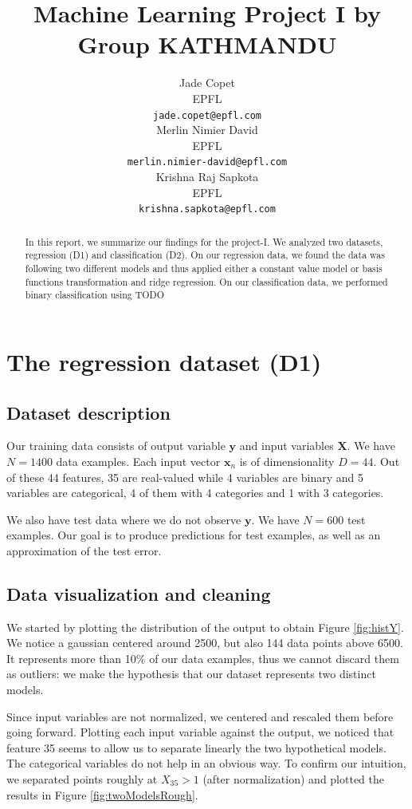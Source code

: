 \documentclass{article} %
\title{Machine Learning Project I by Group KATHMANDU}
\author{
Jade Copet\\
EPFL \\
\texttt{jade.copet@epfl.com} \\
\And
Merlin Nimier David\\
EPFL \\
\texttt{merlin.nimier-david@epfl.com} \\
\And
Krishna Raj Sapkota\\
EPFL \\
\texttt{krishna.sapkota@epfl.com} \\
}
\begin{document}
\maketitle



\begin{abstract}
  In this report, we summarize our findings for the project-I. We analyzed two datasets, regression (D1) and classification (D2). On our regression data, we found the data was following two different models and thus applied either a constant value model or basis functions transformation and ridge regression. On our classification data, we performed binary classification using TODO
\end{abstract}



\section{The regression dataset (D1)}

  \subsection{Dataset description}
  Our training data consists of output variable $\mathbf{y}$ and input variables $\mathbf{X}$. We have $N = 1400$ data examples. Each input vector $\mathbf{x}_n$ is of dimensionality $D = 44$. Out of these 44 features, 35 are real-valued while 4 variables are binary and 5 variables are categorical, 4 of them with 4 categories and 1 with 3 categories.

  We also have test data where we do not observe $\mathbf{y}$. We have $N = 600$ test examples. Our goal is to produce predictions for test examples, as well as an approximation of the test error.

  \subsection{Data visualization and cleaning}
  We started by plotting the distribution of the output to obtain Figure \ref{fig:histY}. We notice a gaussian centered around 2500, but also 144 data points above 6500. It represents more than 10\% of our data examples, thus we cannot discard them as outliers: we make the hypothesis that our dataset represents two distinct models.

  Since input variables are not normalized, we centered and rescaled them before going forward. Plotting each input variable against the output, we noticed that feature 35 seems to allow us to separate linearly the two hypothetical models. The categorical variables do not help in an obvious way. To confirm our intuition, we separated points roughly at $X_{35} > 1$ (after normalization) and plotted the results in Figure \ref{fig:twoModelsRough}.
\end{document}
